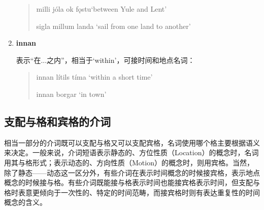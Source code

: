 \begin{enumerate}[itemindent=1em, label=\textbf{\arabic*}.]
\begin{quote}
              milli jóla ok f\k{o}stu\footnotemark `between Yule and Lent'

              sigla millum landa `sail from one land to another'
          \end{quote}


    \item \textbf{innan}

          表示“在...之内”，相当于`within'，可接时间和地点名词：
          \begin{quote}
              innan lítils tíma  `within a short time'

              innan borgar `in town'
          \end{quote}
\end{enumerate}
\subsection{支配与格和宾格的介词}
\label{sec:prep_with_DA}

相当一部分的介词既可以支配与格又可以支配宾格，名词使用哪个格主要根据语义来决定。一般来说，介词短语表示静态的、方位性质（Location）的概念时，名词用其与格形式；表示动态的、方向性质（Motion）的概念时，则用宾格。当然，除了静态——动态这一区分外，有些介词在表示时间概念的时候接宾格，表示地点概念的时候接与格。有些介词既能接与格表示时间也能接宾格表示时间，但支配与格时表意更倾向于一次性的、特定的时间范畴，而接宾格时则有表达重复性的时间概念的含义。

